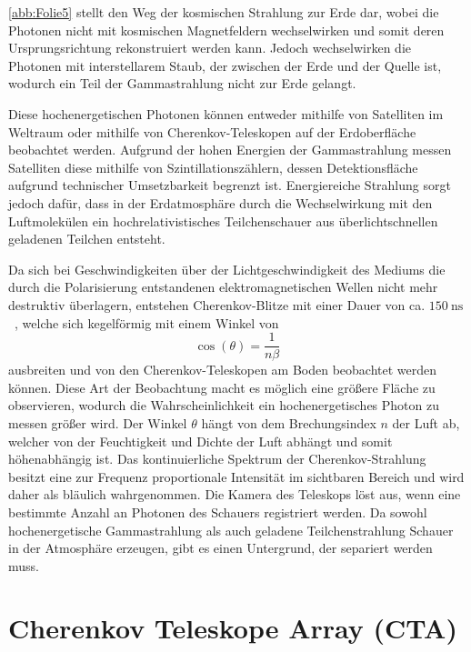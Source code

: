 \autoref{abb:Folie5} stellt den Weg der kosmischen Strahlung zur Erde dar, wobei die Photonen nicht mit kosmischen Magnetfeldern wechselwirken
und somit deren Ursprungsrichtung rekonstruiert werden kann. Jedoch wechselwirken die Photonen mit interstellarem Staub, der zwischen der Erde und der
Quelle ist, wodurch ein Teil der Gammastrahlung nicht zur Erde gelangt.

Diese hochenergetischen Photonen können entweder mithilfe von Satelliten im Weltraum oder mithilfe von Cherenkov-Teleskopen auf
der Erdoberfläche beobachtet werden.
Aufgrund der hohen Energien der Gammastrahlung messen Satelliten diese mithilfe von Szintillationszählern, dessen Detektionsfläche
aufgrund technischer Umsetzbarkeit begrenzt ist.
Energiereiche Strahlung sorgt jedoch dafür, dass in der Erdatmosphäre durch die Wechselwirkung mit den Luftmolekülen ein hochrelativistisches
Teilchenschauer aus überlichtschnellen geladenen Teilchen entsteht.

Da sich bei Geschwindigkeiten über der Lichtgeschwindigkeit des Mediums die durch die Polarisierung entstandenen elektromagnetischen Wellen
nicht mehr destruktiv überlagern, entstehen Cherenkov-Blitze mit einer Dauer von ca. $\SI{150}{\nano\s}$~\cite{Cherenkov_Licht}, welche sich kegelförmig
mit einem Winkel von
\begin{equation}
 \cos(\theta) = \frac{1}{n\beta}
\end{equation}
ausbreiten und von den Cherenkov-Teleskopen am Boden beobachtet werden können.
Diese Art der Beobachtung macht es möglich eine größere Fläche zu observieren, wodurch die Wahrscheinlichkeit ein hochenergetisches
Photon zu messen größer wird.
Der Winkel $\theta$ hängt von dem Brechungsindex $n$ der Luft ab, welcher von der Feuchtigkeit und Dichte der Luft abhängt und somit höhenabhängig ist.
Das kontinuierliche Spektrum der Cherenkov-Strahlung besitzt eine zur Frequenz proportionale Intensität im sichtbaren Bereich und
wird daher als bläulich wahrgenommen.
Die Kamera des Teleskops löst aus, wenn eine bestimmte Anzahl an Photonen des Schauers registriert werden.
Da sowohl hochenergetische Gammastrahlung als auch geladene Teilchenstrahlung
Schauer in der Atmosphäre erzeugen, gibt es einen Untergrund, der separiert werden muss.

\section{Cherenkov Teleskope Array (CTA)}
\label{sec:CTA}

